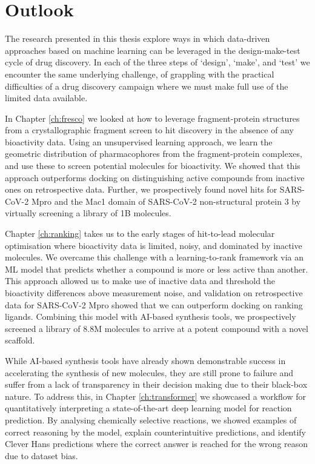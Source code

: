 \chapter{Outlook} \label{ch:outlook}

The research presented in this thesis explore ways in which data-driven approaches based on machine learning can be leveraged in the design-make-test cycle of drug discovery. In each of the three steps of `design', `make', and `test' we encounter the same underlying challenge, of grappling with the practical difficulties of a drug discovery campaign where we must make full use of the limited data available.

In Chapter \ref{ch:fresco} we looked at how to leverage fragment-protein structures from a crystallographic fragment screen to hit discovery in the absence of any bioactivity data. Using an unsupervised learning approach, we learn the geometric distribution of pharmacophores from the fragment-protein complexes, and use these to screen potential molecules for bioactivity. We showed that this approach outperforms docking on distinguishing active compounds from inactive ones on retrospective data. Further, we prospectively found novel hits for SARS-CoV-2 Mpro and the Mac1 domain of SARS-CoV-2 non-structural protein 3 by virtually screening a library of 1B molecules.

Chapter \ref{ch:ranking} takes us to the early stages of hit-to-lead molecular optimisation where bioactivity data is limited, noisy, and dominated by inactive molecules. We overcame this challenge with a learning-to-rank framework via an ML model that predicts whether a compound is more or less active than another. This approach allowed us to make use of inactive data and threshold the bioactivity differences above measurement noise, and validation on retrospective data for SARS-CoV-2 Mpro showed that we can outperform docking on ranking ligands. Combining this model with AI-based synthesis tools, we prospectively screened a library of 8.8M molecules to arrive at a potent compound with a novel scaffold.

While AI-based synthesis tools have already shown demonstrable success in accelerating the synthesis of new molecules, they are still prone to failure and suffer from a lack of transparency in their decision making due to their black-box nature. To address this, in Chapter \ref{ch:transformer} we showcased a workflow for quantitatively interpreting a state-of-the-art deep learning model for reaction prediction. By analysing chemically selective reactions, we showed examples of correct reasoning by the model, explain counterintuitive predictions, and identify Clever Hans predictions where the correct answer is reached for the wrong reason due to dataset bias.

